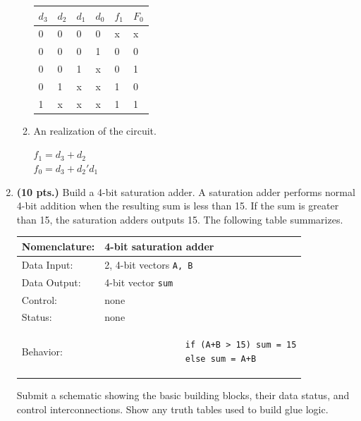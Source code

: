 \begin{enumerate}
\begin{enumerate}
\begin{solution}{
\begin{tabular}{l|l|l|l||l|l}
$d_3$ & $d_2$ & $d_1$ & $d_0$ & $f_1$ & $F_0$ \\ \hline
   0  &    0  &    0  &    0  &    x  &    x  \\ \hline
   0  &    0  &    0  &    1  &    0  &    0  \\ \hline
   0  &    0  &    1  &    x  &    0  &    1  \\ \hline
   0  &    1  &    x  &    x  &    1  &    0  \\ \hline
   1  &    x  &    x  &    x  &    1  &    1  \\
\end{tabular}
} \end{solution}

\item An \SOPmin realization of the circuit.
\begin{solution}{
$f_1 = d_3 + d_2$ \\
$f_0 = d_3 + d_2'd_1$
}\end{solution}
\end{enumerate}

\item {\bf (10 pts.)} Build a 4-bit saturation adder.  A
saturation adder performs normal 4-bit addition when the 
resulting sum is less than 15.  If the sum is
greater than 15, the saturation adders outputs 15.  The
following table summarizes.

\label{page:saturation}
\begin{tabular}{|l|p{3.5in}|} \hline
Nomenclature:  & 4-bit saturation adder                \\ \hline
Data Input:    & 2, 4-bit vectors \verb+A, B+  \\ \hline
Data Output:   & 4-bit vector \verb+sum+    \\ \hline
Control:       & none                                   \\ \hline
Status:        & none                                   \\ \hline
Behavior:      & 
				\begin{verbatim}
				if (A+B > 15) sum = 15
				else sum = A+B
				\end{verbatim}
		 \\ \hline
\end{tabular}

Submit a schematic showing the basic building blocks, their
data status, and control interconnections.  Show any truth
tables used to build glue logic.


\end{enumerate}
